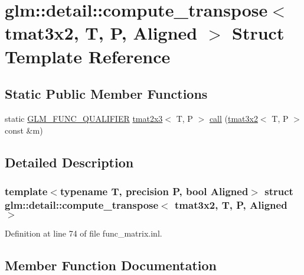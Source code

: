 \hypertarget{structglm_1_1detail_1_1compute__transpose_3_01tmat3x2_00_01_t_00_01_p_00_01_aligned_01_4}{}\section{glm\+::detail\+::compute\+\_\+transpose$<$ tmat3x2, T, P, Aligned $>$ Struct Template Reference}
\label{structglm_1_1detail_1_1compute__transpose_3_01tmat3x2_00_01_t_00_01_p_00_01_aligned_01_4}
\subsection*{Static Public Member Functions}
\begin{DoxyCompactItemize}
\item 
static \mbox{\hyperlink{setup_8hpp_a33fdea6f91c5f834105f7415e2a64407}{G\+L\+M\+\_\+\+F\+U\+N\+C\+\_\+\+Q\+U\+A\+L\+I\+F\+I\+ER}} \mbox{\hyperlink{structglm_1_1tmat2x3}{tmat2x3}}$<$ T, P $>$ \mbox{\hyperlink{structglm_1_1detail_1_1compute__transpose_3_01tmat3x2_00_01_t_00_01_p_00_01_aligned_01_4_a14084c97932d582eb0d6caa2f349d805}{call}} (\mbox{\hyperlink{structglm_1_1tmat3x2}{tmat3x2}}$<$ T, P $>$ const \&m)
\end{DoxyCompactItemize}


\subsection{Detailed Description}
\subsubsection*{template$<$typename T, precision P, bool Aligned$>$\newline
struct glm\+::detail\+::compute\+\_\+transpose$<$ tmat3x2, T, P, Aligned $>$}



Definition at line 74 of file func\+\_\+matrix.\+inl.



\subsection{Member Function Documentation}
\mbox{\label{structglm_1_1detail_1_1compute__transpose_3_01tmat3x2_00_01_t_00_01_p_00_01_aligned_01_4_a14084c97932d582eb0d6caa2f349d805}} 
